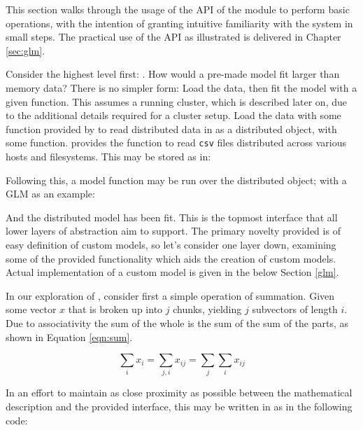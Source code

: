 This section walks through the usage of the API of the \lsr module to perform basic operations, with the intention of granting intuitive familiarity with the system in small steps.
The practical use of the API as illustrated is delivered in Chapter \cref{sec:glm}.

Consider the highest level first: .
How would a pre-made model fit larger than memory data?
There is no simpler form: Load the data, then fit the model with a given function.
This assumes a running cluster, which is described later on, due to the additional details required for a cluster setup.
Load the data with some function provided by \lsr to read distributed data in as a distributed object, with some  function.
\lsr provides the  function to read \texttt{csv} files distributed across various hosts and filesystems.
This may be stored as in:


Following this, a model function may be run over the distributed object; with a GLM as an example:


And the distributed model has been fit.
This is the topmost interface that all lower layers of abstraction aim to support.
The primary novelty provided is of easy definition of custom models, so let's consider one layer down, examining some of the provided functionality which aids the creation of custom models.
Actual implementation of a custom model is given in the below Section \cref{glm}.

In our exploration of \lsr, consider first a simple operation of summation.
Given some vector $x$ that is broken up into $j$ chunks, yielding $j$ subvectors of length $i$.
Due to associativity the sum of the whole is the sum of the sum of the parts, as shown in Equation \cref{eqn:sum}.

\begin{equation}\label{eqn:sum}
    \sum_i x_i= \sum_{j,i}x_{ij} = \sum_j\sum_i x_{ij}
\end{equation}

In an effort to maintain as close proximity as possible between the mathematical description and the provided interface, this may be written in  as in the following  code:


